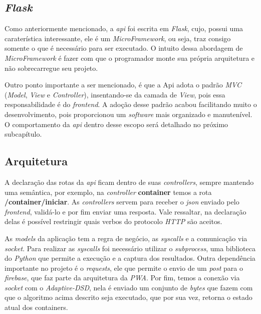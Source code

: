 \subsection{\textit{Flask}}
\label{sec:flask}

Como anteriormente mencionado, a \textit{api} foi escrita em \textit{Flask}, cujo, possui uma caraterística interessante, ele é um \textit{MicroFramework}, ou seja, traz consigo somente o que é necessário para ser executado. O intuito dessa abordagem de \textit{MicroFramework} é fazer com que o programador monte sua própria arquitetura e não sobrecarregue seu projeto. 

Outro ponto importante a ser mencionado, é que a Api adota o padrão \textit{MVC} (\textit{Model}, \textit{View} e \textit{Controller}), insentando-se da camada de \textit{View}, pois essa responsabilidade é do \textit{frontend}. A adoção desse padrão acabou facilitando muito o desenvolvimento, pois proporcionou um \textit{software} mais organizado e manutenível. O comportamento da \textit{api} dentro desse escopo será detalhado no próximo subcapítulo.

\subsection{Arquitetura}

A declaração das rotas da \textit{api} ficam dentro de suas \textit{controllers}, sempre mantendo uma semântica, por exemplo, na \textit{controller} \textbf{container} temos a rota \textbf{/container/iniciar}. As \textit{controllers} servem para receber o \textit{json} enviado pelo \textit{frontend}, validá-lo e por fim enviar uma resposta. Vale ressaltar, na declaração delas é possível restringir quais verbos do protocolo \textit{HTTP} são aceitos.

As \textit{models} da aplicação tem a regra de negócio, as \textit{syscalls} e a comunicação via \textit{socket}. Para realizar as \textit{syscalls} foi necessário utilizar o \textit{subprocess}, uma biblioteca do \textit{Python} que permite a execução e a captura dos resultados. Outra dependência importante no projeto é o \textit{requests}, ele que permite o envio de um \textit{post} para o \textit{firebase}, que faz parte da arquitetura da \textit{PWA}. Por fim, temos a conexão via \textit{socket} com o \textit{Adaptive-DSD}, nela é enviado um conjunto de \textit{bytes} que fazem com que o algoritmo acima descrito seja executado, que por sua vez, retorna o estado atual dos containers.



